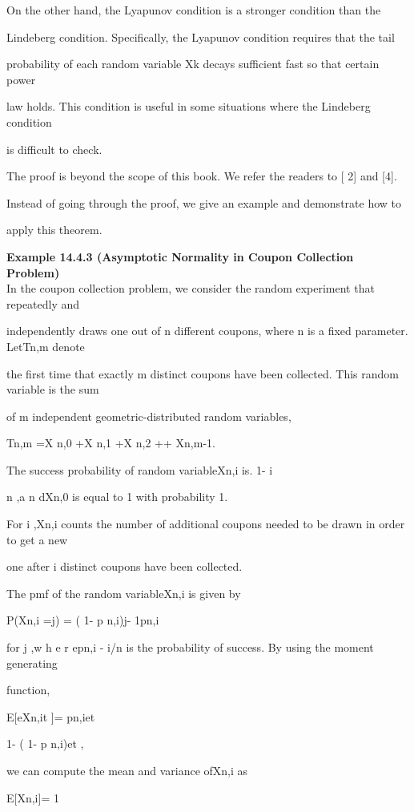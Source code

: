 On the other hand, the Lyapunov condition is a stronger condition than the

Lindeberg condition. Specifically, the Lyapunov condition requires that the tail

probability of each random variable Xk decays sufficient fast so that certain power

law holds. This condition is useful in some situations where the Lindeberg condition

is difficult to check.

The proof is beyond the scope of this book. We refer the readers to [ 2] and [4].

Instead of going through the proof, we give an example and demonstrate how to

apply this theorem.

\textbf{Example 14.4.3 (Asymptotic Normality in Coupon Collection Problem)} \\

In the coupon collection problem, we consider the random experiment that repeatedly and

independently draws one out of n different coupons, where n is a fixed parameter. LetTn,m denote

the first time that exactly m distinct coupons have been collected. This random variable is the sum

of m independent geometric-distributed random variables,

Tn,m =X n,0 +X n,1 +X n,2 +\cdot\cdot\cdot+ Xn,m-1.

The success probability of random variableXn,i is. 1- i

n ,a n dXn,0 is equal to 1 with probability 1.

For i ,Xn,i counts the number of additional coupons needed to be drawn in order to get a new

one after i distinct coupons have been collected.

The pmf of the random variableXn,i is given by

P(Xn,i =j) = ( 1- p n,i)j- 1pn,i

for j ,w h e r epn,i  - i/n is the probability of success. By using the moment generating

function,

E[eXn,it ]= pn,iet

1- ( 1- p n,i)et ,

we can compute the mean and variance ofXn,i as

E[Xn,i]= 1

